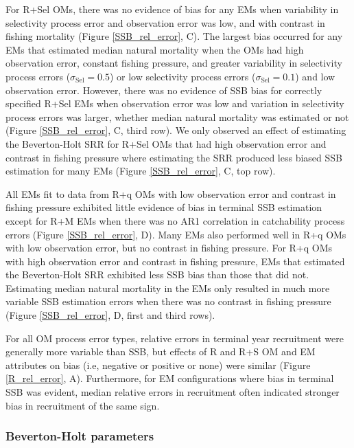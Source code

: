 \documentclass[
  12pt,
]{article}
\begin{document}
For R+Sel OMs, there was no evidence of bias for any EMs when
variability in selectivity process error and observation error was low,
and with contrast in fishing mortality (Figure \ref{SSB_rel_error}, C).
The largest bias occurred for any EMs that estimated median natural
mortality when the OMs had high observation error, constant fishing
pressure, and greater variability in selectivity process errors
(\(\sigma_{\text{Sel}} = 0.5\)) or low selectivity process errors
(\(\sigma_{\text{Sel}} = 0.1\)) and low observation error. However,
there was no evidence of SSB bias for correctly specified R+Sel EMs when
observation error was low and variation in selectivity process errors
was larger, whether median natural mortality was estimated or not
(Figure \ref{SSB_rel_error}, C, third row). We only observed an effect
of estimating the Beverton-Holt SRR for R+Sel OMs that had high
observation error and contrast in fishing pressure where estimating the
SRR produced less biased SSB estimation for many EMs (Figure
\ref{SSB_rel_error}, C, top row).

All EMs fit to data from R+q OMs with low observation error and contrast
in fishing pressure exhibited little evidence of bias in terminal SSB
estimation except for R+M EMs when there was no AR1 correlation in
catchability process errors (Figure \ref{SSB_rel_error}, D). Many EMs
also performed well in R+q OMs with low observation error, but no
contrast in fishing pressure. For R+q OMs with high observation error
and contrast in fishing pressure, EMs that estimated the Beverton-Holt
SRR exhibited less SSB bias than those that did not. Estimating median
natural mortality in the EMs only resulted in much more variable SSB
estimation errors when there was no contrast in fishing pressure (Figure
\ref{SSB_rel_error}, D, first and third rows).

For all OM process error types, relative errors in terminal year
recruitment were generally more variable than SSB, but effects of R and
R+S OM and EM attributes on bias (i.e, negative or positive or none)
were similar (Figure \ref{R_rel_error}, A). Furthermore, for EM
configurations where bias in terminal SSB was evident, median relative
errors in recruitment often indicated stronger bias in recruitment of
the same sign.

\subsubsection*{Beverton-Holt
parameters}\label{beverton-holt-parameters}
\end{document}
